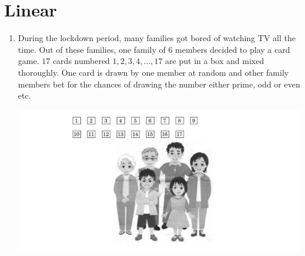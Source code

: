 \documentclass{article}
\begin{document}
\section*{\center Linear}
\begin{enumerate}
    \item During the lockdown period, many families got bored of watching TV all the time. Out of these families, one family of $6$  members decided to play a card game. $17$ cards numbered $1,2,3,4, ..., 17$ are put in a box and mixed thoroughly. One card is drawn by one member at random and other family members bet for the chances of drawing the number either prime, odd or even etc.
    \begin{center}
            \includegraphics[scale=0.3]{./figs/1.jpg}
    \end{center}
    

\end{enumerate}
\end{document}
